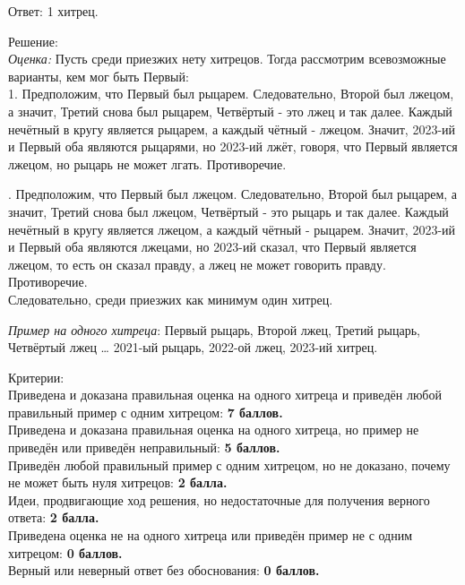 \hspace{3mm}

Ответ: 1 хитрец.

Решение:\\
\textit{Оценка:} Пусть среди приезжих нету хитрецов. Тогда рассмотрим всевозможные варианты, кем мог быть Первый:\\
1. Предположим, что Первый был рыцарем. Следовательно, Второй был лжецом, а значит, Третий снова был рыцарем, Четвёртый - это лжец и так далее. Каждый нечётный в кругу является рыцарем, а каждый чётный - лжецом. Значит, 2023-ий и Первый оба являются рыцарями, но 2023-ий лжёт, говоря, что Первый является лжецом, но рыцарь не может лгать. Противоречие.


\newpage

\hspace{3mm}

. Предположим, что Первый был лжецом. Следовательно, Второй был рыцарем, а значит, Третий снова был лжецом, Четвёртый - это рыцарь и так далее. Каждый нечётный в кругу является лжецом, а каждый чётный - рыцарем. Значит, 2023-ий и Первый оба являются лжецами, но 2023-ий сказал, что Первый является лжецом, то есть он сказал правду, а лжец не может говорить правду. Противоречие.\\
Следовательно, среди приезжих как минимум один хитрец.

\textit{Пример на одного хитреца}: Первый рыцарь, Второй лжец, Третий рыцарь, Четвёртый лжец … 2021-ый рыцарь, 2022-ой лжец, 2023-ий хитрец.

\hspace{3mm}

Критерии:\\
Приведена и доказана правильная оценка на одного хитреца и приведён любой правильный пример с одним хитрецом: \textbf{7 баллов.}\\
Приведена и доказана правильная оценка на одного хитреца, но пример не приведён или приведён неправильный: \textbf{5 баллов.}\\
Приведён любой правильный пример с одним хитрецом, но не доказано, почему не может быть нуля хитрецов: \textbf{2 балла.}\\
Идеи, продвигающие ход решения, но недостаточные для получения верного ответа: \textbf{2 балла.}\\
Приведена оценка не на одного хитреца или приведён пример не с одним хитрецом: \textbf{0 баллов.}\\
Верный или неверный ответ без обоснования: \textbf{0 баллов.}

